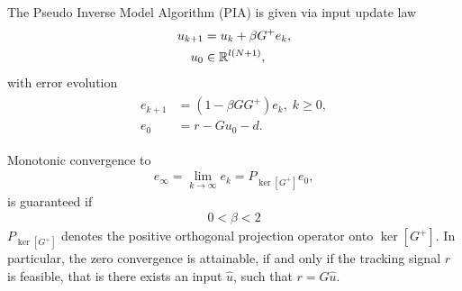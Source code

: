 \begin{alg}
	\label{alg:ILC:PIA}

	The Pseudo Inverse Model Algorithm (PIA) is given via input update law 
	\begin{align}
	\label{eq:ILD:errPIA}
	\begin{split}
	u_{k+1} &= u_k + \beta G^{+} e_k, \\
	u_0 & \in {\mathbb{R}}^{l (N+1)},
	\end{split}	
	\end{align}
	with error evolution
	\begin{align}
	\begin{split}
	e_{k+1} &= (1- \beta G G^+) e_{k}, \; k\geq 0, \\
	e_0 &= r -  Gu_0 -d.
	\end{split}
	\end{align}

	Monotonic convergence to 
	\begin{align}
	\label{eq:ILC:einfPIA} 
	e_\infty  = \lim_{k\to\infty} e_k = P_{\ker[G^+]}e_0,
	\end{align} 
	is guaranteed if
	\begin{align*}
	0 <\beta < 2
	\end{align*}
	$P_{\ker[G^+]}$ denotes the positive orthogonal projection operator onto $\ker[G^+]$.
	In particular, the zero convergence is attainable, if and only if the tracking signal $r$ is feasible, that is there exists an input $\hat u$, such that $r = G \hat u$. %
\end{alg}

